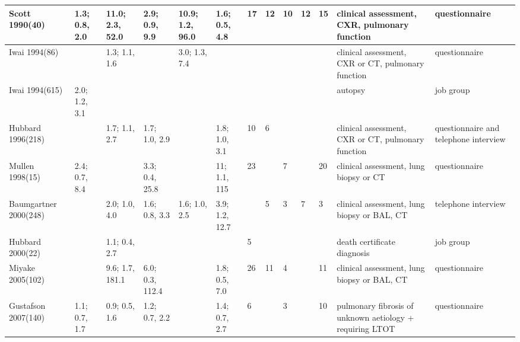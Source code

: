 \documentclass[a4paper,10pt]{article}
\begin{document}
\begin{table}[htbp]
\begin{tabular}{|p{1.5cm}|p{0.5cm}p{0.5cm}p{0.5cm}p{0.5cm}p{0.5cm}|p{0.5cm}p{0.5cm}p{0.5cm}p{0.5cm}p{0.5cm}|p{2.5cm}|p{2cm}|}
        Scott 1990(40)\cite{Scott1990}                   & 1.3; 0.8, 2.0 & 11.0; 2.3, 52.0 & 2.9; 0.9, 9.9 & 10.9; 1.2, 96.0 & 1.6; 0.5, 4.8 & 17 & 12 & 10 & 12 & 15 & clinical assessment, CXR, pulmonary function             & questionnaire                         \\
\hline
        Iwai 1994(86)\cite{Iwai1994}                     &               & 1.3; 1.1, 1.6   &               & 3.0; 1.3, 7.4   &    &    &    &    &   & & clinical assessment, CXR or CT, pulmonary function       & questionnaire                         \\
\hline
        Iwai 1994(615)\cite{Iwai1994}                    & 2.0; 1.2, 3.1 &               &               &               &    &    &    &    & & & autopsy                                                  & job group                             \\
\hline
        Hubbard 1996(218)\cite{Hubbard1996a}                 &               & 1.7; 1.1, 2.7   & 1.7; 1.0, 2.9   &               &  1.8; 1.0, 3.1  & 10 & 6  &    &  & & clinical assessment, CXR or CT, pulmonary function       & questionnaire and telephone interview \\
\hline
        Mullen 1998(15)\cite{Mullen1998}                   & 2.4; 0.7, 8.4   &               & 3.3; 0.4, 25.8  &  & 11; 1.1, 115             & 23 &    & 7  &    & 20 & clinical assessment, lung biopsy or CT                   & questionnaire                         \\
\hline
        Baumgartner 2000(248)\cite{Baumgartner2000}             &               & 2.0; 1.0, 4.0   & 1.6; 0.8, 3.3   & 1.6; 1.0, 2.5   & 3.9; 1.2, 12.7 &   & 5  & 3  & 7 & 3 & clinical assessment, lung biopsy or BAL, CT              & telephone interview                   \\
\hline
        Hubbard 2000(22)\cite{Hubbard2000}                  &               & 1.1; 0.4, 2.7   &               &               &    & 5  &    &    &  & & death certificate diagnosis                              & job group                             \\
\hline
        Miyake 2005(102)\cite{Miyake2005}                  &               & 9.6; 1.7, 181.1 & 6.0; 0.3, 112.4 &    & 1.8; 0.5, 7.0           & 26 & 11 & 4  &    & 11 & clinical assessment, lung biopsy or BAL, CT              & questionnaire                         \\
\hline
        Gustafson 2007(140)\cite{Gustafson2007}               & 1.1; 0.7, 1.7   & 0.9; 0.5, 1.6   & 1.2; 0.7, 2.2   &   & 1.4; 0.7, 2.7           & 6  &    & 3  &    & 10 & pulmonary fibrosis of unknown aetiology + requiring LTOT & questionnaire                         \\

\end{tabular}
\end{table}
\end{document}
